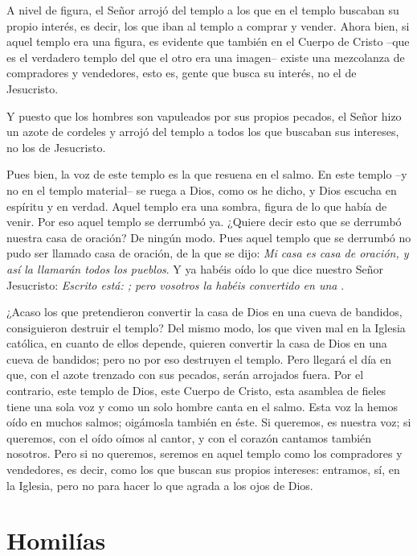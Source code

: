 \begin{body}
A nivel de figura, el Señor arrojó del templo a los que en el templo buscaban su propio interés, es decir, los que iban al templo a comprar y vender. Ahora bien, si aquel templo era una figura, es evidente que también en el Cuerpo de Cristo –que es el verdadero templo del que el otro era una imagen– existe una mezcolanza de compradores y vendedores, esto es, gente que busca su interés, no el de Jesucristo.

Y puesto que los hombres son vapuleados por sus propios pecados, el Señor hizo un azote de cordeles y arrojó del templo a todos los que buscaban sus intereses, no los de Jesucristo.

Pues bien, la voz de este templo es la que resuena en el salmo. En este templo –y no en el templo material– se ruega a Dios, como os he dicho, y Dios escucha en espíritu y en verdad. Aquel templo era una sombra, figura de lo que había de venir. Por eso aquel templo se derrumbó ya. ¿Quiere decir esto que se derrumbó nuestra casa de oración? De ningún modo. Pues aquel templo que se derrumbó no pudo ser llamado casa de oración, de la que se dijo: \textit{Mi casa es casa de oración, y así la llamarán todos los pueblos}. Y ya habéis oído lo que dice nuestro Señor Jesucristo: \textit{Escrito está: ; pero vosotros la habéis convertido en una }.

¿Acaso los que pretendieron convertir la casa de Dios en una cueva de bandidos, consiguieron destruir el templo? Del mismo modo, los que viven mal en la Iglesia católica, en cuanto de ellos depende, quieren convertir la casa de Dios en una cueva de bandidos; pero no por eso destruyen el templo. Pero llegará el día en que, con el azote trenzado con sus pecados, serán arrojados fuera. Por el contrario, este templo de Dios, este Cuerpo de Cristo, esta asamblea de fieles tiene una sola voz y como un solo hombre canta en el salmo. Esta voz la hemos oído en muchos salmos; oigámosla también en éste. Si queremos, es nuestra voz; si queremos, con el oído oímos al cantor, y con el corazón cantamos también nosotros. Pero si no queremos, seremos en aquel templo como los compradores y vendedores, es decir, como los que buscan sus propios intereses: entramos, sí, en la Iglesia, pero no para hacer lo que agrada a los ojos de Dios.
\end{body}


\newsection
\section{Homilías}


